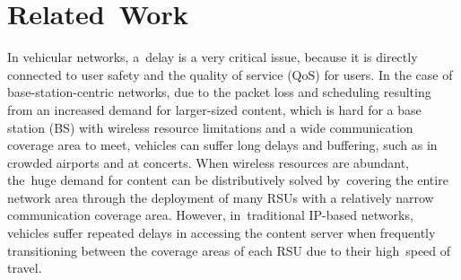 \documentclass[sensors,aricle,accept,pdftex,moreauthors]{Definitions/mdpi}
\begin{document}
\section{Related~Work} \label{sec2}
In vehicular networks, a~delay is a very critical issue, because it is directly connected to user safety and the quality of service (QoS) for users.
In the case of base-station-centric networks, due to the packet loss and scheduling resulting from an increased demand for larger-sized content, which is hard for a base station (BS) with wireless resource limitations and a wide communication coverage area to meet, 
vehicles can suffer long delays and buffering, such as in crowded airports and at concerts.
When wireless resources are abundant, the~huge demand for content can be distributively solved by~covering the entire network area through the deployment of many RSUs with a relatively narrow communication coverage area. 
However, in~traditional IP-based networks, vehicles suffer repeated delays in accessing the content server when frequently transitioning between the coverage areas of each RSU due to their high~speed of travel.
\end{document}
